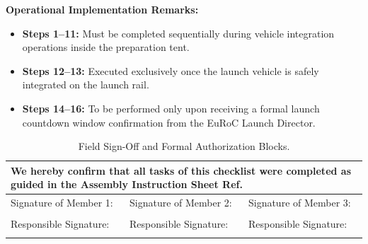 \documentclass[11pt,a4paper]{article}
\begin{document}
\noindent
\begin{minipage}{\textwidth}
\small
\textbf{\color{EtseNavy}Operational Implementation Remarks:}
\begin{itemize}
    \item \textbf{Steps 1--11:} Must be completed sequentially during vehicle integration operations inside the preparation tent.
    \item \textbf{Steps 12--13:} Executed exclusively once the launch vehicle is safely integrated on the launch rail.
    \item \textbf{Steps 14--16:} To be performed only upon receiving a formal launch countdown window confirmation from the EuRoC Launch Director.
\end{itemize}
\end{minipage}

\vspace{0.4cm}

\begin{table}[H]
    \centering
    \small
    \caption{Field Sign-Off and Formal Authorization Blocks.}
    \label{tab:checklist_signatures}
    \vspace{0.2cm}
    \begin{tabularx}{\textwidth}{|X|X|X|}
        \hline
        \multicolumn{3}{|p{\dimexpr\textwidth-2\tabcolsep-2\arrayrulewidth}|}{We hereby confirm that all tasks of this checklist were completed as guided in the Assembly Instruction Sheet Ref. \hrulefill} \\ \hline
        \rule{0pt}{1.5cm} Signature of Member 1: & Signature of Member 2: & Signature of Member 3: \\ 
        \hrulefill & \hrulefill & \hrulefill \\ \hline
        \rule{0pt}{1.5cm} Responsible Signature: & Responsible Signature: & Responsible Signature: \\ 
        \hrulefill & \hrulefill & \hrulefill \\ \hline
    \end{tabularx}
\end{table}
\end{document}
